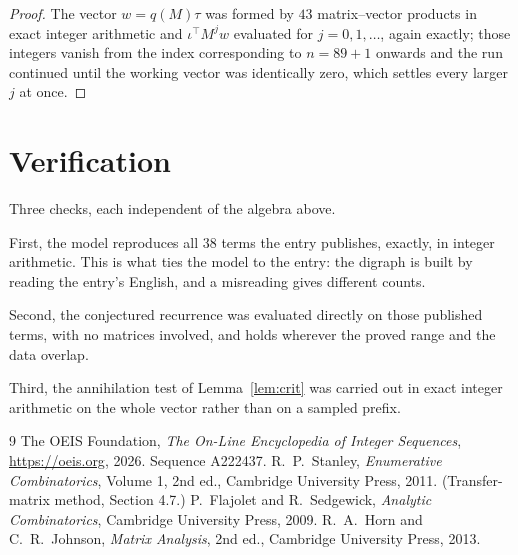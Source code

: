 \documentclass[11pt,a4paper]{article}
\theoremstyle{plain}
\theoremstyle{definition}
\begin{document}
\begin{proof}
The vector $w=q(M)\tau$ was formed by $43$ matrix--vector products in exact integer
arithmetic and $\iota^{\!\top}M^{j}w$ evaluated for $j=0,1,\dots$, again exactly; those
integers vanish from the index corresponding to $n=89+1$ onwards and the run continued
until the working vector was identically zero, which settles every larger $j$ at once.
\end{proof}

\section{Verification}

Three checks, each independent of the algebra above.

First, the model reproduces all $38$ terms the entry publishes, exactly, in integer
arithmetic. This is what ties the model to the entry: the digraph is built by reading the
entry's English, and a misreading gives different counts.

Second, the conjectured recurrence was evaluated directly on those published terms, with no
matrices involved, and holds wherever the proved range and the data overlap.

Third, the annihilation test of Lemma~\ref{lem:crit} was carried out in exact integer
arithmetic on the whole vector rather than on a sampled prefix.

\begin{thebibliography}{9}
 The OEIS Foundation, \emph{The On-Line Encyclopedia of Integer
Sequences}, \url{https://oeis.org}, 2026. Sequence A222437.
 R.~P.~Stanley, \emph{Enumerative Combinatorics}, Volume 1, 2nd ed.,
Cambridge University Press, 2011. (Transfer-matrix method, Section 4.7.)
 P.~Flajolet and R.~Sedgewick, \emph{Analytic Combinatorics}, Cambridge
University Press, 2009.
 R.~A.~Horn and C.~R.~Johnson, \emph{Matrix Analysis}, 2nd ed., Cambridge
University Press, 2013.
\end{thebibliography}
\end{document}
